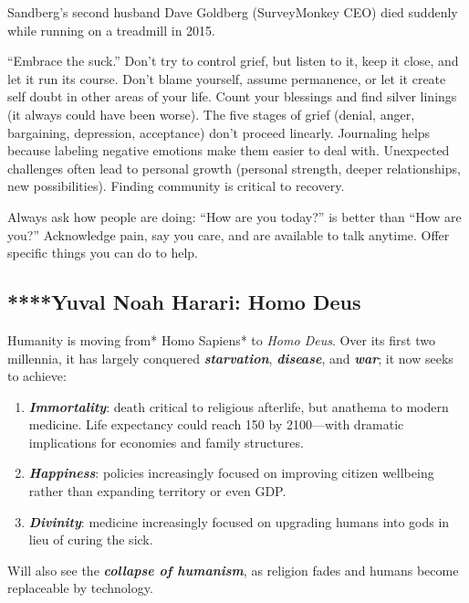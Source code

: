 \documentclass[
]{article}
\begin{document}
Sandberg's second husband Dave Goldberg (SurveyMonkey CEO) died suddenly
while running on a treadmill in 2015.

``Embrace the suck.'' Don't try to control grief, but listen to it, keep
it close, and let it run its course. Don't blame yourself, assume
permanence, or let it create self doubt in other areas of your life.
Count your blessings and find silver linings (it always could have been
worse). The five stages of grief (denial, anger, bargaining, depression,
acceptance) don't proceed linearly. Journaling helps because labeling
negative emotions make them easier to deal with. Unexpected challenges
often lead to personal growth (personal strength, deeper relationships,
new possibilities). Finding community is critical to recovery.

Always ask how people are doing: ``How are you today?'' is better than
``How are you?'' Acknowledge pain, say you care, and are available to
talk anytime. Offer specific things you can do to help.

\hypertarget{yuval-noah-harari-homo-deus}{%
\subsection{****Yuval Noah Harari: Homo
Deus}\label{yuval-noah-harari-homo-deus}}

Humanity is moving from* Homo Sapiens* to \emph{Homo Deus}. Over its
first two millennia, it has largely conquered
\textbf{\emph{starvation}}, \textbf{\emph{disease}}, and
\textbf{\emph{war}}; it now seeks to achieve:

\begin{enumerate}
\def\labelenumi{\arabic{enumi}.}
\item
  \textbf{\emph{Immortality}}: death critical to religious afterlife,
  but anathema to modern medicine. Life expectancy could reach 150 by
  2100---with dramatic implications for economies and family structures.
\item
  \textbf{\emph{Happiness}}: policies increasingly focused on improving
  citizen wellbeing rather than expanding territory or even GDP.
\item
  \textbf{\emph{Divinity}}: medicine increasingly focused on upgrading
  humans into gods in lieu of curing the sick.
\end{enumerate}

Will also see the \textbf{\emph{collapse of humanism}}, as religion
fades and humans become replaceable by technology.
\end{document}
